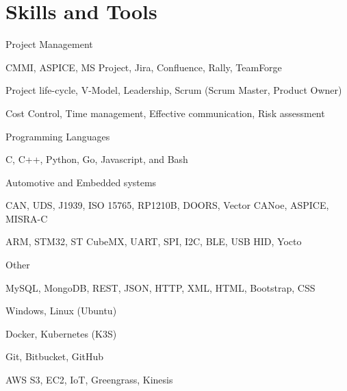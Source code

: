 
\section{Skills and Tools}

\skillgroup
    {Project Management}
    {
        \begin{itemize-bullets}
            \item{CMMI, ASPICE, MS Project, Jira, Confluence, Rally, TeamForge}
            \item{Project life-cycle, V-Model, Leadership, Scrum (Scrum Master, Product Owner)}
            \item{Cost Control, Time management, Effective communication, Risk assessment}
        \end{itemize-bullets}
    }

\skillgroup
    {Programming Languages}
    {
        \begin{itemize-bullets}
            \item{C, C++, Python, Go, Javascript, and Bash}
        \end{itemize-bullets}
    }

\skillgroup
    {Automotive and Embedded systems}
    {
        \begin{itemize-bullets}
            \item{CAN, UDS, J1939, ISO 15765, RP1210B, DOORS, Vector CANoe, ASPICE, MISRA-C}
            \item{ARM, STM32, ST CubeMX, UART, SPI, I2C, BLE, USB HID, Yocto}
        \end{itemize-bullets}
    }

\skillgroup
    {Other}
    {
        \begin{itemize-bullets}
            \item{MySQL, MongoDB, REST, JSON, HTTP, XML, HTML, Bootstrap, CSS}
            \item{Windows, Linux (Ubuntu)}
            \item{Docker, Kubernetes (K3S)}
            \item{Git, Bitbucket, GitHub}
            \item{AWS S3, EC2, IoT, Greengrass, Kinesis}
        \end{itemize-bullets}
    }

